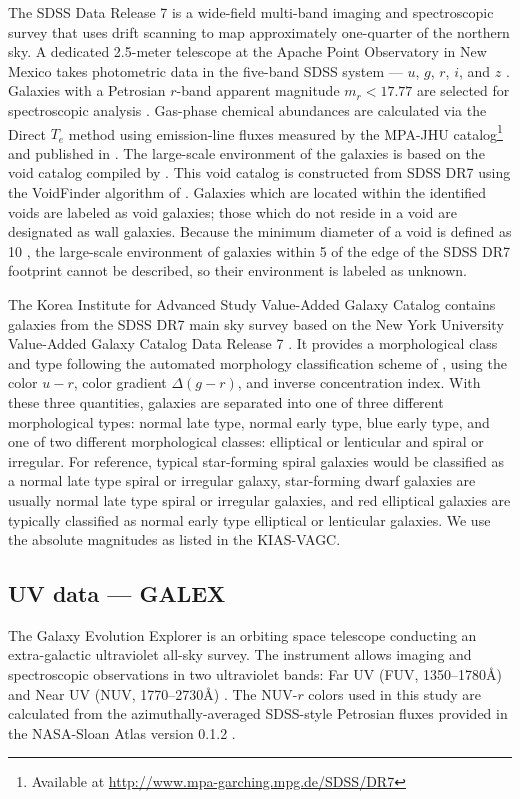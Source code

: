 The SDSS Data Release 7 \citep[DR7;][]{Abazajian09} is a wide-field multi-band 
imaging and spectroscopic survey that uses drift scanning to map approximately 
one-quarter of the northern sky.  A dedicated 2.5-meter telescope at the Apache 
Point Observatory in New Mexico takes photometric data in the five-band SDSS 
system --- $u$, $g$, $r$, $i$, and $z$ \citep{Fukugita96,Gunn98}.  Galaxies with 
a Petrosian $r$-band apparent magnitude $m_r < 17.77$ are selected for 
spectroscopic analysis \citep{Lupton01,Strauss02}.  Gas-phase chemical 
abundances are calculated via the Direct $T_e$ method using emission-line fluxes 
measured by the MPA-JHU catalog\footnote{Available at 
\url{http://www.mpa-garching.mpg.de/SDSS/DR7}} and published in 
\cite{Douglass17c}.  The large-scale environment of the galaxies is based on the 
void catalog compiled by \cite{Pan12}.  This void catalog is constructed from 
SDSS DR7 using the VoidFinder algorithm of \cite{Hoyle02}.  Galaxies which are 
located within the identified voids are labeled as void galaxies; those which do 
not reside in a void are designated as wall galaxies.  Because the minimum 
diameter of a void is defined as 10 \hMpc , the large-scale environment of 
galaxies within 5 \hMpc of the edge of the SDSS DR7 footprint cannot be 
described, so their environment is labeled as unknown.

The Korea Institute for Advanced Study Value-Added Galaxy Catalog 
\citep[KIAS-VAGC;][]{Choi10} contains galaxies from the SDSS DR7 main sky survey 
based on the New York University Value-Added Galaxy Catalog Data Release 7 
\citep[NYU-VAGC;][]{Blanton05}.  It provides a morphological class and type 
following the automated morphology classification scheme of \cite{Park05}, using 
the color $u-r$, color gradient $\Delta (g-r)$, and inverse concentration index.  
With these three quantities, galaxies are separated into one of three different 
morphological types: normal late type, normal early type, blue early type, and 
one of two different morphological classes: elliptical or lenticular and spiral 
or irregular.  For reference, typical star-forming spiral galaxies would be 
classified as a normal late type spiral or irregular galaxy, star-forming dwarf 
galaxies are usually normal late type spiral or irregular galaxies, and red 
elliptical galaxies are typically classified as normal early type elliptical or 
lenticular galaxies.  We use the absolute magnitudes as listed in the KIAS-VAGC.

\subsection{UV data --- GALEX}\label{sec:GALEX}
The Galaxy Evolution Explorer \citep[GALEX]{Martin05} is an orbiting space 
telescope conducting an extra-galactic ultraviolet all-sky survey.  The 
instrument allows imaging and spectroscopic observations in two ultraviolet 
bands: Far UV (FUV, 1350--1780\AA) and Near UV (NUV, 1770--2730\AA) 
\citep{Morrissey07}.  The NUV-$r$ colors used in this study are calculated from 
the azimuthally-averaged SDSS-style Petrosian fluxes provided in the NASA-Sloan 
Atlas version 0.1.2 \citep[NSA]{Blanton11}.


